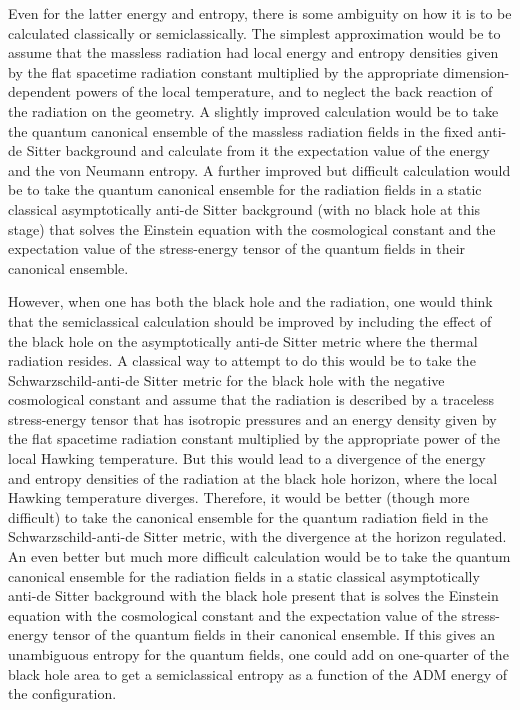 \documentclass[12pt]{article} \usepackage{latexsym} \textwidth 15cm
\begin{document}
Even for the latter energy and entropy, there is some ambiguity on how
it is to be calculated classically or semiclassically.  The simplest
approximation would be to assume that the massless radiation had local
energy and entropy densities given by the flat spacetime radiation
constant multiplied by the appropriate dimension-dependent powers of
the local temperature, and to neglect the back reaction of the
radiation on the geometry.  A slightly improved calculation would be to
take the quantum canonical ensemble of the massless radiation fields in
the fixed anti-de Sitter background and calculate from it the
expectation value of the energy and the von Neumann entropy.  A further
improved but difficult calculation would be to take the quantum
canonical ensemble for the radiation fields in a static classical
asymptotically anti-de Sitter background (with no black hole at this
stage) that solves the Einstein equation with the cosmological constant
and the expectation value of the stress-energy tensor of the quantum
fields in their canonical ensemble.

However, when one has both the black hole and the radiation, one would
think that the semiclassical calculation should be improved by
including the effect of the black hole on the asymptotically
anti-de Sitter metric where the thermal radiation resides.  A classical
way to attempt to do this would be to take the
Schwarzschild-anti-de Sitter metric for the black hole with the negative
cosmological constant and assume that the radiation is described by a
traceless stress-energy tensor that has isotropic pressures and an
energy density given by the flat spacetime radiation constant
multiplied by the appropriate power of the local Hawking temperature. 
But this would lead to a divergence of the energy and entropy densities
of the radiation at the black hole horizon, where the local Hawking
temperature diverges.  Therefore, it would be better (though more
difficult) to take the canonical ensemble for the quantum radiation
field in the Schwarzschild-anti-de Sitter metric, with the divergence at
the horizon regulated.  An even better but much more difficult
calculation would be to take the quantum canonical ensemble for the
radiation fields in a static classical asymptotically anti-de Sitter
background with the black hole present that is solves the Einstein
equation with the cosmological constant and the expectation value of
the stress-energy tensor of the quantum fields in their canonical
ensemble.  If this gives an unambiguous entropy for the quantum fields,
one could add on one-quarter of the black hole area to get a
semiclassical entropy as a function of the ADM energy of the
configuration.
\end{document}
